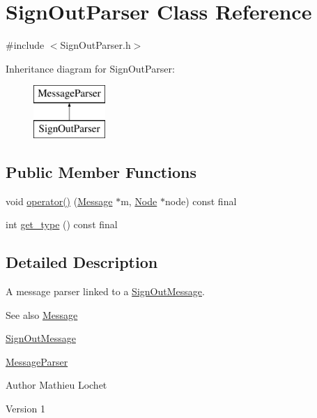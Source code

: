 \hypertarget{classSignOutParser}{}\section{Sign\+Out\+Parser Class Reference}
\label{classSignOutParser}


{\ttfamily \#include $<$Sign\+Out\+Parser.\+h$>$}

Inheritance diagram for Sign\+Out\+Parser\+:\begin{figure}[H]
\begin{center}
\leavevmode
\includegraphics[height=2.000000cm]{classSignOutParser}
\end{center}
\end{figure}
\subsection*{Public Member Functions}
\begin{DoxyCompactItemize}
\item 
void \mbox{\hyperlink{classSignOutParser_a29ec80b982d783c10d46a431947bb319}{operator()}} (\mbox{\hyperlink{classMessage}{Message}} $\ast$m, \mbox{\hyperlink{classNode}{Node}} $\ast$node) const final
\item 
int \mbox{\hyperlink{classSignOutParser_afe949de785ce36746d69e19515a72d24}{get\+\_\+type}} () const final
\end{DoxyCompactItemize}


\subsection{Detailed Description}
A message parser linked to a \mbox{\hyperlink{classSignOutMessage}{Sign\+Out\+Message}}. \begin{DoxySeeAlso}{See also}
\mbox{\hyperlink{classMessage}{Message}} 

\mbox{\hyperlink{classSignOutMessage}{Sign\+Out\+Message}} 

\mbox{\hyperlink{classMessageParser}{Message\+Parser}}
\end{DoxySeeAlso}
\begin{DoxyAuthor}{Author}
Mathieu Lochet 
\end{DoxyAuthor}
\begin{DoxyVersion}{Version}
1 
\end{DoxyVersion}


